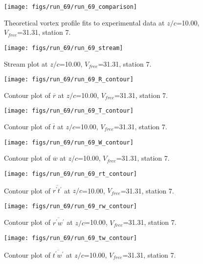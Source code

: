 \begin{figure}[H]
\centering
\texttt{[image: figs/run\_69/run\_69\_comparison]}
\caption{Theoretical vortex profile fits to experimental data at $z/c$=10.00, $V_{free}$=31.31, station 7.}
\label{fig:run_69_comparison}
\end{figure}


\begin{figure}[H]
\centering
\texttt{[image: figs/run\_69/run\_69\_stream]}
\caption{Stream plot at $z/c$=10.00, $V_{free}$=31.31, station 7.}
\label{fig:run_69_stream}
\end{figure}


\begin{figure}[H]
\centering
\texttt{[image: figs/run\_69/run\_69\_R\_contour]}
\caption{Contour plot of $\overline{r}$ at $z/c$=10.00, $V_{free}$=31.31, station 7.}
\label{fig:run_69_R_contour}
\end{figure}


\begin{figure}[H]
\centering
\texttt{[image: figs/run\_69/run\_69\_T\_contour]}
\caption{Contour plot of $\overline{t}$ at $z/c$=10.00, $V_{free}$=31.31, station 7.}
\label{fig:run_69_T_contour}
\end{figure}


\begin{figure}[H]
\centering
\texttt{[image: figs/run\_69/run\_69\_W\_contour]}
\caption{Contour plot of $\overline{w}$ at $z/c$=10.00, $V_{free}$=31.31, station 7.}
\label{fig:run_69_W_contour}
\end{figure}


\begin{figure}[H]
\centering
\texttt{[image: figs/run\_69/run\_69\_rt\_contour]}
\caption{Contour plot of $\overline{r^\prime t^\prime}$ at $z/c$=10.00, $V_{free}$=31.31, station 7.}
\label{fig:run_69_rt_contour}
\end{figure}


\begin{figure}[H]
\centering
\texttt{[image: figs/run\_69/run\_69\_rw\_contour]}
\caption{Contour plot of $\overline{r^\prime w^\prime}$ at $z/c$=10.00, $V_{free}$=31.31, station 7.}
\label{fig:run_69_rw_contour}
\end{figure}


\begin{figure}[H]
\centering
\texttt{[image: figs/run\_69/run\_69\_tw\_contour]}
\caption{Contour plot of $\overline{t^\prime w^\prime}$ at $z/c$=10.00, $V_{free}$=31.31, station 7.}
\label{fig:run_69_tw_contour}
\end{figure}


